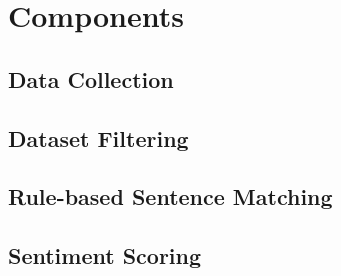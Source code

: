 \documentclass{report}
\begin{document}

\section{Components}

\subsection{Data Collection}



\subsection{Dataset Filtering}




\subsection{Rule-based Sentence Matching}



\subsection{Sentiment Scoring}

\end{document}
